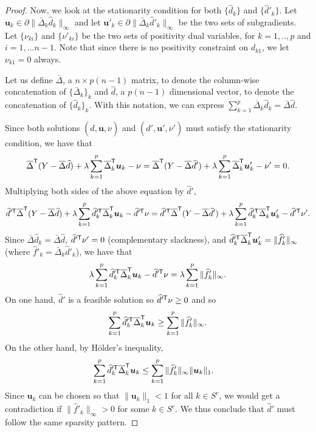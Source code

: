 \begin{proof}
Now, we look at the stationarity condition for both $\{ \hat{d}_k \}$
and $\{ \hat{d}'_k \}$. Let $\mathbf{u}_k \in \partial \|
\bar{\Delta}_k \hat{d}_k \|_\infty$ and let $\mathbf{u}'_k
\in \partial \| \bar{\Delta}_k \hat{d}'_k \|_\infty$ be the two sets
of subgradients. Let $\{ \nu_{ki} \}$ and $\{
\nu'_{ki} \}$ be the two sets of positivity dual
variables, for $k=1,..,p$ and $i=1,...n-1$.  Note that since there is no positivity constraint on
$d_{k1}$, we let $\nu_{k1} = 0$ always.

Let us define $\bar{\Delta}$, a $n \times p(n-1)$ matrix, to denote the column-wise concatenation of $\{ \bar{\Delta}_k \}_k$ and $\hat{d}$, a $p(n-1)$ dimensional vector, to denote the concatenation of $\{ \hat{d}_k \}_k$. With this notation, we can express $\sum_{k=1}^p \bar{\Delta}_k \hat{d}_k = \bar{\Delta} \hat{d}$.

Since both solutions $(\hat{d}, \mathbf{u}, \nu)$ and $(\hat{d}',
\mathbf{u}', \nu')$ must satisfy the stationarity condition, we have
that
\[
\overline{\Delta}^{\mathsf{T}} ( Y - \overline{\Delta} \widehat{d} ) 
   + \lambda \sum_{k=1}^p \overline{\Delta}_k^{\mathsf{T}} \mbox{\boldmath $u$}_k - \nu = 
\overline{\Delta}^{\mathsf{T}} ( Y - \overline{\Delta} \widehat{d}' ) 
   + \lambda \sum_{k=1}^p \overline{\Delta}_k^{\mathsf{T}} \mbox{\boldmath $u$}'_k - \nu' = 0.
\] 
Multiplying both sides of the above equation by $\hat{d}'$,
\[
\widehat{d}'^{\mathsf{T}}  \overline{\Delta}^{\mathsf{T}} ( Y - \overline{\Delta} \widehat{d} ) 
    + \lambda \sum_{k=1}^p \widehat{d}'^{\mathsf{T}}_k \overline{\Delta}_k^{\mathsf{T}} \mbox{\boldmath $u$}_k - \widehat{d}'^{\mathsf{T}} \nu = \widehat{d}'^{\mathsf{T}}  \overline{\Delta}^{\mathsf{T}} ( Y - \overline{\Delta} \widehat{d}' ) 
    + \lambda \sum_{k=1}^p \widehat{d}'^{\mathsf{T}}_k \overline{\Delta}_k^{\mathsf{T}} \mbox{\boldmath $u$}'_k - \widehat{d}'^{\mathsf{T}} \nu'.
\]
Since $\bar{\Delta} \hat{d}_k = \bar{\Delta} \hat{d}$, $\widehat{d}'^{\mathsf{T}} \nu' = 0$ (complementary slackness), and $\widehat{d}'^{\mathsf{T}}_k \overline{\Delta}_k^{\mathsf{T}} \mbox{\boldmath $u$}'_k  = \| \widehat{f}'_k \|_\infty$ (where $\hat{f}'_k = \bar{\Delta}_k \hat{d}'_k$), we have that
\[
\lambda \sum_{k=1}^p \widehat{d}'^{\mathsf{T}}_k \overline{\Delta}_k^{\mathsf{T}} \mbox{\boldmath $u$}_k - \widehat{d}'^{\mathsf{T}} \nu = \lambda \sum_{k=1}^p \| \widehat{f}'_k \|_\infty.
\]
On one hand, $\hat{d}'$ is a feasible solution so $\widehat{d}'^{\mathsf{T}} \nu \geq 0$ and so 
\[
\sum_{k=1}^p \widehat{d}'^{\mathsf{T}}_k \overline{\Delta}_k^{\mathsf{T}} \mbox{\boldmath $u$}_k \geq \sum_{k=1}^p \| \widehat{f}'_k \|_\infty .
\]
On the other hand, by H\"older's inequality,
\begin{align*}
\sum_{k=1}^p \widehat{d}'^{\mathsf{T}}_k \overline{\Delta}_k^{\mathsf{T}} \mbox{\boldmath $u$}_k &\leq 
   \sum_{k=1}^p \| \widehat{f}'_k \|_\infty \|\mbox{\boldmath $u$}_k \|_1 .
\end{align*}
Since $\mathbf{u}_k$ can be chosen so that $\| \mathbf{u}_k \|_1 < 1$ for all $k \in S^c$, we would get a contradiction if $\| \hat{f}'_k \|_\infty > 0$ for some $k \in S^c$. We thus conclude that $\hat{d}'$ must follow the same sparsity pattern.



\end{proof}
